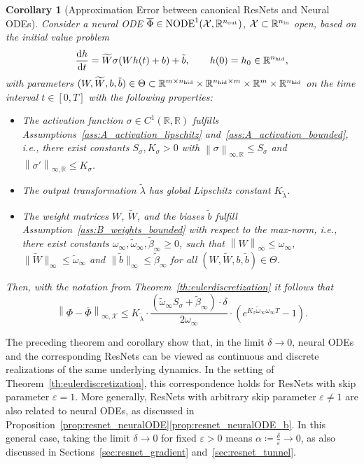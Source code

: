 \documentclass[10pt]{article}
\newtheorem{corollary}[theorem]{Corollary}
\theoremstyle{definition}
\numberwithin{equation}{section}
\newcommand{\eps}{\varepsilon}
\newcommand\norm[1]{\left\lVert#1\right\rVert}
\newcommand\normm[1]{\big\lVert#1\big\lVert}
\newcommand{\R}{\mathbb{R}}
\newcommand*{\dd}{\mathrm{d}}
\newcommand*{\nout}{n_\textup{out}}
\newcommand*{\nhid}{n_\textup{hid}}
\newcommand*{\nin}{n_\textup{in}}
\begin{document}
\begin{corollary}[Approximation Error between canonical ResNets and Neural ODEs] \label{cor:node_resnet_error}
	Consider a neural ODE $\overline{\Phi} \in \textup{NODE}^1(\mathcal{X},\R^{\nout})$, $\mathcal{X} \subset \R^{\nin}$ open, based on the initial value problem
	\begin{equation*}
		\frac{\dd h}{\dd t} = \widetilde{W} \sigma(W h(t) +b) + \tilde{b}, \qquad h(0) = h_0 \in \R^{\nhid},
	\end{equation*}
	with parameters $(W,\widetilde{W},b,\tilde{b})\in \Theta \subset \R^{m \times \nhid} \times \R^{\nhid\times m} \times \R^m \times \R^{\nhid}$ on the time interval $t\in[0,T]$ with the following properties:
	\begin{itemize}
		\item The activation function $\sigma\in C^1(\R,\R)$ fulfills Assumptions~\ref{ass:A_activation_lipschitz} and~\ref{ass:A_activation_bounded}, i.e., there exist constants $S_\sigma, K_\sigma > 0$ with  $\norm{\sigma}_{\infty,\R} \leq S_\sigma$ and $\norm{\sigma'}_{\infty,\R} \leq K_\sigma$.
		\item The output transformation $\tilde{\lambda}$ has global Lipschitz constant $K_{\tilde{\lambda}}$.
        \item The weight matrices $W$, $\widetilde{W}$, and the biases $\tilde{b}$ fulfill Assumption~\ref{ass:B_weights_bounded} with respect to the max-norm, i.e., there exist constants $\omega_\infty, \widetilde{\omega}_\infty, \tilde{\beta}_\infty \geq 0$, such that $\norm{W}_\infty\leq \omega_\infty$, $\normm{\widetilde{W}}_\infty \leq \widetilde{\omega}_\infty $ and $\normm{\tilde{b}}_\infty \leq \tilde{\beta}_\infty$  for all $(W,\widetilde{W},b,\tilde{b})\in \Theta$.
	\end{itemize}
	Then, with the notation from Theorem~\ref{th:eulerdiscretization} it follows that
	\begin{equation}\label{eq:node_resnet_error_2}
		  \norm{\Phi-\overline{\Phi}}_{\infty,\mathcal{X}} \leq  K_{\tilde{\lambda}} \cdot \frac{\left(\widetilde{\omega}_\infty  S_\sigma + \tilde{\beta}_\infty\right) \cdot \delta }{2\omega_\infty}\cdot \left(e^{ K_{\sigma} \widetilde{\omega}_\infty\omega_\infty T}-1\right).
	\end{equation}
\end{corollary}

The preceding theorem and corollary show that, in the limit $\delta \rightarrow 0$, neural ODEs and the corresponding ResNets can be viewed as continuous and discrete realizations of the same underlying dynamics. In the setting of Theorem~\ref{th:eulerdiscretization}, this correspondence holds for ResNets with skip parameter $\eps = 1$. More generally, ResNets with arbitrary skip parameter $\eps \neq 1$ are also related to neural ODEs, as discussed in Proposition~\ref{prop:resnet_neuralODE}\ref{prop:resnet_neuralODE_b}. In this general case, taking the limit $\delta \rightarrow 0$ for fixed $\eps > 0$ means $\alpha \coloneqq \frac{\delta}{\eps} \rightarrow 0$, as also discussed in Sections~\ref{sec:resnet_gradient} and~\ref{sec:resnet_tunnel}. 
\end{document}
